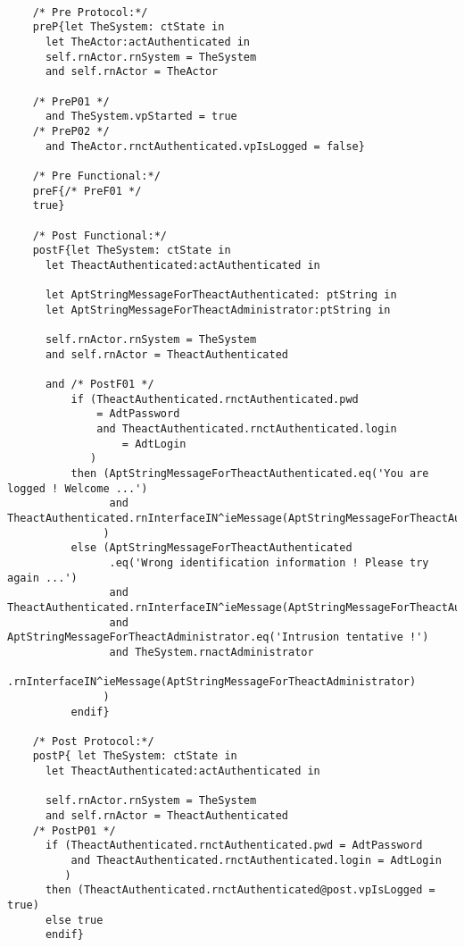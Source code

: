 	\scriptsize
	\vspace{0.5cm}
	\begin{lstlisting}[style=MessirStyle,firstnumber=auto,captionpos=b,caption={\msrmessir (MCL-oriented) specification of the operation \emph{oeLogin}.},label=OM-actAuthenticated-oeLogin-MCL-LST]

	/* Pre Protocol:*/ 
	preP{let TheSystem: ctState in
	  let TheActor:actAuthenticated in
	  self.rnActor.rnSystem = TheSystem
	  and self.rnActor = TheActor
	  
	/* PreP01 */
	  and TheSystem.vpStarted = true
	/* PreP02 */
	  and TheActor.rnctAuthenticated.vpIsLogged = false}
	
	/* Pre Functional:*/
	preF{/* PreF01 */
	true}
	
	/* Post Functional:*/ 
	postF{let TheSystem: ctState in
	  let TheactAuthenticated:actAuthenticated in
	
	  let AptStringMessageForTheactAuthenticated: ptString in
	  let AptStringMessageForTheactAdministrator:ptString in
	  
	  self.rnActor.rnSystem = TheSystem
	  and self.rnActor = TheactAuthenticated
	  
	  and /* PostF01 */
	      if (TheactAuthenticated.rnctAuthenticated.pwd
	          = AdtPassword
	          and TheactAuthenticated.rnctAuthenticated.login
	              = AdtLogin
	         )
	      then (AptStringMessageForTheactAuthenticated.eq('You are logged ! Welcome ...')
	            and TheactAuthenticated.rnInterfaceIN^ieMessage(AptStringMessageForTheactAuthenticated)
	           )
	      else (AptStringMessageForTheactAuthenticated
	            .eq('Wrong identification information ! Please try again ...')
	            and TheactAuthenticated.rnInterfaceIN^ieMessage(AptStringMessageForTheactAuthenticated)
	            and AptStringMessageForTheactAdministrator.eq('Intrusion tentative !')
	            and TheSystem.rnactAdministrator
	                .rnInterfaceIN^ieMessage(AptStringMessageForTheactAdministrator)
	           )
	      endif}
	
	/* Post Protocol:*/ 
	postP{ let TheSystem: ctState in
	  let TheactAuthenticated:actAuthenticated in
	
	  self.rnActor.rnSystem = TheSystem
	  and self.rnActor = TheactAuthenticated
	/* PostP01 */
	  if (TheactAuthenticated.rnctAuthenticated.pwd = AdtPassword
	      and TheactAuthenticated.rnctAuthenticated.login = AdtLogin
	     )
	  then (TheactAuthenticated.rnctAuthenticated@post.vpIsLogged = true)
	  else true
	  endif}
	
	\end{lstlisting}
	\normalsize 
	

